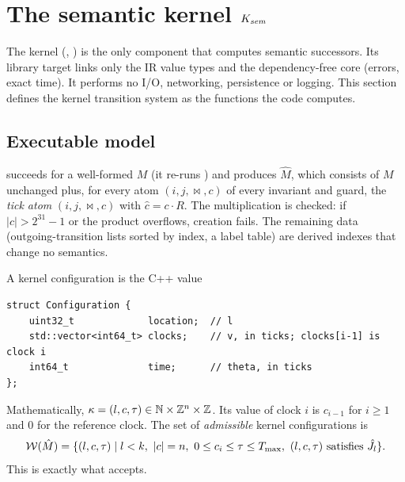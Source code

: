 \section{The semantic kernel $K_{\mathit{sem}}$}\label{sec:kernel}

The kernel (, ) is the only component
that computes semantic successors. Its library target links only the IR value
types and the dependency-free core (errors, exact time). It performs no I/O,
networking, persistence or logging. This section defines the kernel transition
system as the functions the code computes.

\subsection{Executable model}

\begin{definition}\label{def:kmodel}
 succeeds for a well-formed $M$ (it re-runs
) and produces $\hat M$, which consists of $M$ unchanged plus, for
every atom $(i,j,\bowtie,c)$ of every invariant and guard, the \emph{tick atom}
$(i,j,\bowtie,\hat c)$ with $\hat c=c\cdot R$. The multiplication is checked: if
$|c|>2^{31}-1$ or the product overflows, creation fails. The remaining data
(outgoing-transition lists sorted by index, a label table) are derived indexes
that change no semantics.
\end{definition}

\begin{definition}\label{def:kconf}
A kernel configuration is the C++ value
\begin{lstlisting}
struct Configuration {
    uint32_t             location;  // l
    std::vector<int64_t> clocks;    // v, in ticks; clocks[i-1] is clock i
    int64_t              time;      // theta, in ticks
};
\end{lstlisting}
Mathematically, $\kappa=(l,c,\tau)\in\mathbb{N}\times\mathbb{Z}^n\times\mathbb{Z}$. Its value of clock
$i$ is $c_{i-1}$ for $i\ge1$ and $0$ for the reference clock. The set of
\emph{admissible} kernel configurations is
\[
  \W(\hat M)=\{(l,c,\tau)\mid l<k,\ |c|=n,\ 0\le c_{i}\le\tau\le\Tmax,\ (l,c,\tau)\text{ satisfies }\hat J_l\}.
\]
This is exactly what  accepts.
\end{definition}

